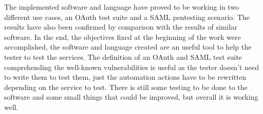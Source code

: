 The implemented software and language have proved to be working in two different use cases, an OAuth test suite and a SAML pentesting scenario. The results have also been confirmed by comparison with the results of similar software. In the end, the objectives fixed at the beginning of the work were accomplished, the software and language created are an useful tool to help the tester to test the services. The definition of an OAuth and SAML test suite comprehending the well-known vulnerabilities is useful as the tester doesn't need to write them to test them, just the automation actions have to be rewritten depending on the service to test. There is still some testing to be done to the software and some small things that could be improved, but overall it is working well.






